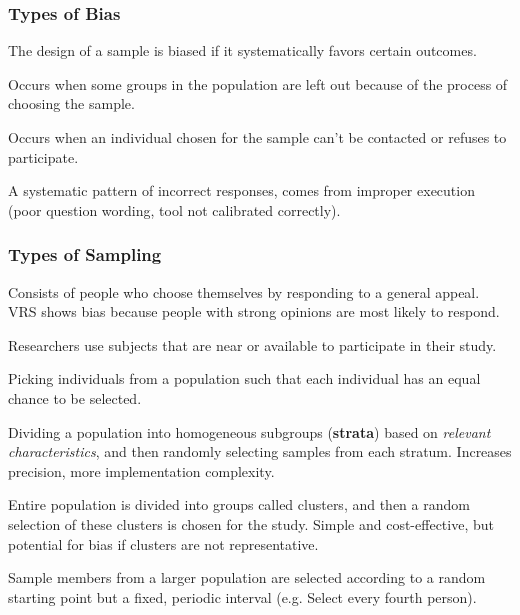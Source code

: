\documentclass[]{article}
\newenvironment{definitions}{
	\begin{description}[font=\sffamily\bfseries, leftmargin=1cm, style=nextline]
	}{
	\end{description}
}
\begin{document}
	\subsubsection{Types of Bias}
	\begin{definitions}
		\item[Bias]
		The design of a sample is biased if it systematically favors certain outcomes.
		\item[Selection bias]
		Occurs when some groups in the population are left out because of the process of choosing the sample.
		\item[Nonresponse]
		Occurs when an individual chosen for the sample can't be contacted or refuses to participate.
		\item[Response bias]
		A systematic pattern of incorrect responses, comes from improper execution (poor question wording, tool not calibrated correctly).
	\end{definitions}
	\subsubsection{Types of Sampling}
	\begin{definitions}
		\item[Voluntary Response Sample (-)]
		Consists of people who choose themselves by responding to a general appeal. VRS shows bias because people with strong opinions are most likely to respond.
		\item[Sample of Convenience (-)]
		Researchers use subjects that are near or available to participate in their study.
		\item[Simple random sampling ($\cdot$)]
		Picking individuals from a population such that each individual has an equal chance to be selected.
		\item[Stratified sampling (+)]
		Dividing a population into homogeneous subgroups (\textbf{strata}) based on \textit{relevant characteristics}, and then randomly selecting samples from each stratum. Increases precision, more implementation complexity.
		\item[Cluster sampling (+)]
		Entire population is divided into groups called clusters, and then a random selection of these clusters is chosen for the study. Simple and cost-effective, but potential for bias if clusters are not representative.
		\item[Systematic sampling ($\cdot$)]
		Sample members from a larger population are selected according to a random starting point but a fixed, periodic interval (e.g. Select every fourth person).
	\end{definitions}
\end{document}
